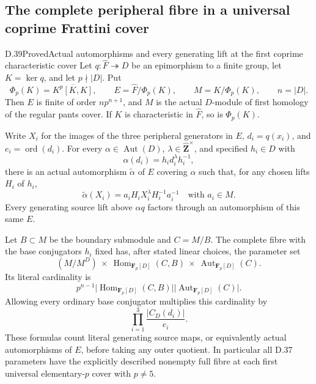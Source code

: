 \subsection{The complete peripheral fibre in a universal coprime Frattini cover}

\begin{statement}{D.39}{Proved}{Actual automorphisms and every generating lift at the first coprime characteristic cover}
Let \(q:\widehat F\twoheadrightarrow D\) be an epimorphism to a
finite group, let \(K=\ker q\), and let \(p\nmid |D|\).
Put
\[
 \Phi_p(K)=\overline{K^p[K,K]},\qquad
 E=\widehat F/\Phi_p(K),\qquad
 M=K/\Phi_p(K),\qquad n=|D|.
 \tag{D.39.1}
\]
Then \(E\) is finite of order \(n p^{n+1}\), and \(M\) is the
actual \(D\)-module of first homology of the regular pants cover.
If \(K\) is characteristic in \(\widehat F\), so is
\(\Phi_p(K)\).

Write \(X_i\) for the images of the three peripheral generators
in \(E\), \(d_i=q(x_i)\), and \(e_i=\operatorname{ord}(d_i)\).
For every \(\alpha\in\operatorname{Aut}(D)\),
\(\lambda\in\widehat{\mathbf Z}^{\times}\), and specified
\(h_i\in D\) with
\[
                 \alpha(d_i)=h_i d_i^\lambda h_i^{-1},
 \tag{D.39.2}
\]
there is an actual automorphism \(\widetilde\alpha\) of \(E\)
covering \(\alpha\) such that, for any chosen lifts \(H_i\) of
\(h_i\),
\[
 \widetilde\alpha(X_i)
       =a_iH_iX_i^\lambda H_i^{-1}a_i^{-1}
                     \quad\text{with }a_i\in M.
 \tag{D.39.3}
\]
Every generating source lift above \(\alpha q\) factors
through an automorphism of this same \(E\).

Let \(B\subset M\) be the boundary submodule and \(C=M/B\).
The complete fibre with the base conjugators \(h_i\) fixed
has, after stated linear choices, the parameter set
\[
 (M/M^D)\ \times\
 \operatorname{Hom}_{\mathbf F_p[D]}(C,B)\ \times\
 \operatorname{Aut}_{\mathbf F_p[D]}(C).
 \tag{D.39.4}
\]
Its literal cardinality is
\[
 p^{n-1}
 \bigl|\operatorname{Hom}_{\mathbf F_p[D]}(C,B)\bigr|
 \bigl|\operatorname{Aut}_{\mathbf F_p[D]}(C)\bigr|.
 \tag{D.39.5}
\]
Allowing every ordinary base conjugator multiplies this
cardinality by
\[
                       \prod_{i=1}^3
                       \frac{|C_D(d_i)|}{e_i}.
 \tag{D.39.6}
\]
These formulas count literal generating source maps, or
equivalently actual automorphisms of \(E\), before taking
any outer quotient.
In particular all D.37 parameters have the explicitly
described nonempty full fibre at each first universal
elementary-\(p\) cover with \(p\ne5\).
\end{statement}


